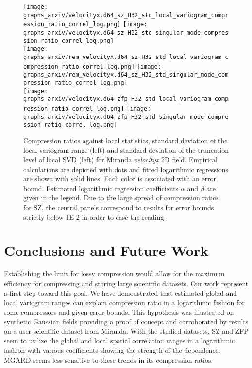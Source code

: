 \documentclass[conference]{IEEEtran}
\begin{document}
%
\begin{figure}
\centering
\texttt{[image: graphs\_arxiv/velocityx.d64\_sz\_H32\_std\_local\_variogram\_compression\_ratio\_correl\_log.png]} \hspace{-8pt} 
\texttt{[image: graphs\_arxiv/velocityx.d64\_sz\_H32\_std\_singular\_mode\_compression\_ratio\_correl\_log.png]} \\
\vspace{-10pt}
\texttt{[image: graphs\_arxiv/rem\_velocityx.d64\_sz\_H32\_std\_local\_variogram\_compression\_ratio\_correl\_log.png]} \hspace{-8pt} 
\texttt{[image: graphs\_arxiv/rem\_velocityx.d64\_sz\_H32\_std\_singular\_mode\_compression\_ratio\_correl\_log.png]} \\
\vspace{-10pt}
\texttt{[image: graphs\_arxiv/velocityx.d64\_zfp\_H32\_std\_local\_variogram\_compression\_ratio\_correl\_log.png]} \hspace{-8pt} 
\texttt{[image: graphs\_arxiv/velocityx.d64\_zfp\_H32\_std\_singular\_mode\_compression\_ratio\_correl\_log.png]} \\
\vspace{-10pt}
\caption{Compression ratios against local statistics, standard deviation of the local variogram range (left) and standard deviation of the truncation level of local SVD (left) for Miranda \textit{velocityx} 2D field. 
Empirical calculations are depicted with dots and fitted logarithmic regressions are shown with solid lines. Each color is associated with an error bound. 
Estimated logarithmic regression coefficients $\alpha$ and $\beta$ are given in the legend. 
Due to the large spread of compression ratios for SZ, the central panels correspond to results for error bounds strictly below 1E-2 in order to ease the reading. }
\label{fig:results_localstats_miranda}
\vspace{-15pt}
\end{figure}


\section{Conclusions and Future Work}

Establishing the limit for lossy compression would allow for the maximum efficiency for compressing and storing large scientific datasets. 
Our work represent a first step toward this goal.  
We have demonstrated that estimated global and local variogram ranges can explain compression ratio in a logarithmic fashion for some compressors and given error bounds.
This hypothesis was illustrated on synthetic Gaussian fields providing a proof of concept and corroborated by results on a user scientific dataset from Miranda. 
With the studied datasets, SZ and ZFP seem to utilize the global and local spatial correlation ranges in a logarithmic fashion with various coefficients showing the strength of the dependence. MGARD seems less sensitive to these trends in its compression ratios. 
\end{document}
